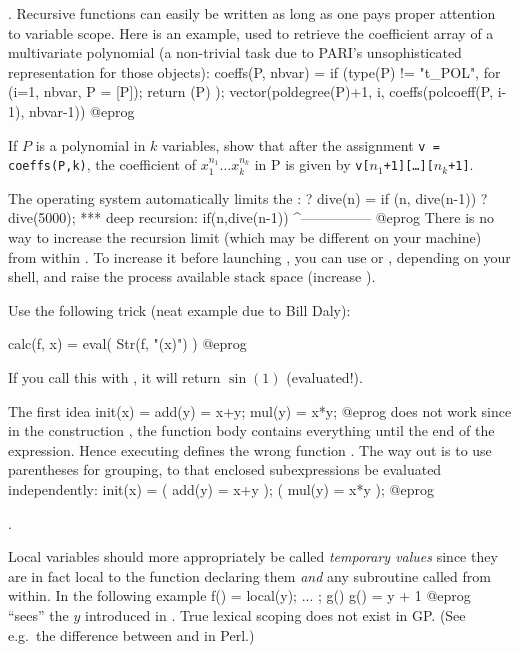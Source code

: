 . Recursive functions can easily
be written as long as one pays proper attention to variable scope. Here is an
example, used to retrieve the coefficient array of a multivariate polynomial
(a non-trivial task due to PARI's unsophisticated representation for those
objects): 
\bprog
coeffs(P, nbvar) =
{
  if (type(P) != "t_POL",
    for (i=1, nbvar, P = [P]);
    return (P)
  );
  vector(poldegree(P)+1, i, coeffs(polcoeff(P, i-1), nbvar-1))
}
@eprog

\noindent If $P$ is a polynomial in $k$ variables, show that after the
assignment {\tt v = coeffs(P,k)}, the coefficient of $x_1^{n_1}\dots
x_k^{n_k}$ in P is given by {\tt v[$n_1$+1][\dots][$n_k$+1]}.

The operating system automatically limits the :
\bprog
? dive(n) = if (n, dive(n-1))
? dive(5000);
  ***   deep recursion: if(n,dive(n-1))
                        ^---------------
@eprog
There is no way to increase the recursion limit (which may be different on
your machine) from within . To increase it before launching ,
you can use  or , depending on your shell, and raise
the process available stack space (increase ).

Use the following trick (neat example due to Bill Daly):

\bprog
calc(f, x) = eval( Str(f, "(x)") )
@eprog

\noindent If you call this with , it will
return $\sin(1)$ (evaluated!).

The first idea
\bprog
  init(x) = add(y) = x+y; mul(y) = x*y;
@eprog
\noindent does not work since in the construction , the
function body contains everything until the end of the expression. Hence
executing  defines the wrong function . The way out is to
use parentheses for grouping, to that enclosed subexpressions be
evaluated independently:
\bprog
  init(x) = ( add(y) = x+y ); ( mul(y) = x*y );
@eprog

.\label{se:varscope}

Local variables should more appropriately be called \emph{temporary values}
since they are in fact local to the function declaring them \emph{and} any
subroutine called from within. In the following example
\bprog
  f() = local(y); ... ; g()
  g() = y + 1
@eprog
\noindent {} ``sees'' the $y$ introduced in . True lexical
scoping does not exist in GP. (See e.g.~the difference between 
and  in Perl.)

